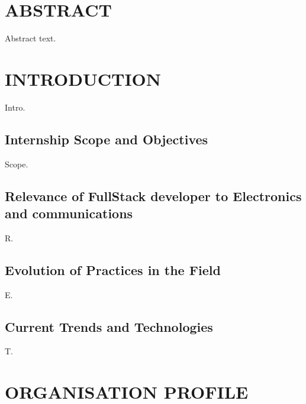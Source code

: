 \documentclass[12pt,a4paper]{report}
\begin{document}
\newpage
\chapter*{ABSTRACT}


Abstract text.


\newpage
\tableofcontents
{}

\newpage
\listoffigures
{}

\chapter{INTRODUCTION}


Intro.


\section{Internship Scope and Objectives}

Scope.


\section{Relevance of FullStack developer to Electronics and communications}

R.


\section{Evolution of Practices in the Field}

E.


\section{Current Trends and Technologies}

T.




\chapter{ORGANISATION PROFILE}
\end{document}
